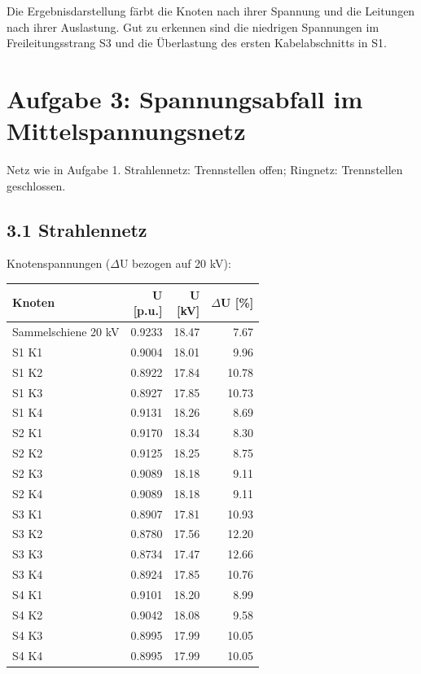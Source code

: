 \documentclass[11pt,a4paper]{article}
\begin{document}
Die Ergebnisdarstellung färbt die Knoten nach ihrer Spannung und die Leitungen nach ihrer Auslastung. Gut zu erkennen sind die niedrigen Spannungen im Freileitungsstrang S3 und die Überlastung des ersten Kabelabschnitts in S1.

\clearpage

\section{Aufgabe 3: Spannungsabfall im Mittelspannungsnetz}

Netz wie in Aufgabe 1. Strahlennetz: Trennstellen offen; Ringnetz: Trennstellen geschlossen.

\subsection{3.1 Strahlennetz}

Knotenspannungen ($\Delta$U bezogen auf 20 kV):

\begin{table}[H]
\centering
\begin{adjustbox}{max width=\linewidth}
\begin{tabular}{lrrr}
\toprule
\textbf{Knoten} & \thead{U \\ {[p.u.]}} & \thead{U \\ {[kV]}} & \thead{$\Delta$U \\ {[\%]}} \\
\midrule
Sammelschiene 20 kV & 0.9233 & 18.47 & 7.67 \\
S1 K1 & 0.9004 & 18.01 & 9.96 \\
S1 K2 & 0.8922 & 17.84 & 10.78 \\
S1 K3 & 0.8927 & 17.85 & 10.73 \\
S1 K4 & 0.9131 & 18.26 & 8.69 \\
S2 K1 & 0.9170 & 18.34 & 8.30 \\
S2 K2 & 0.9125 & 18.25 & 8.75 \\
S2 K3 & 0.9089 & 18.18 & 9.11 \\
S2 K4 & 0.9089 & 18.18 & 9.11 \\
S3 K1 & 0.8907 & 17.81 & 10.93 \\
S3 K2 & 0.8780 & 17.56 & 12.20 \\
S3 K3 & 0.8734 & 17.47 & 12.66 \\
S3 K4 & 0.8924 & 17.85 & 10.76 \\
S4 K1 & 0.9101 & 18.20 & 8.99 \\
S4 K2 & 0.9042 & 18.08 & 9.58 \\
S4 K3 & 0.8995 & 17.99 & 10.05 \\
S4 K4 & 0.8995 & 17.99 & 10.05 \\
\bottomrule
\end{tabular}
\end{adjustbox}
\end{table}
\end{document}
